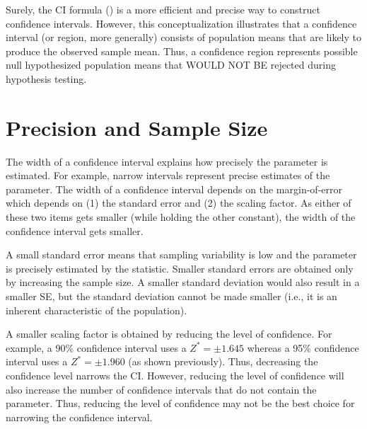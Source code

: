 \documentclass[10pt,openany]{book}\usepackage[]{graphicx}\usepackage[]{color}
\begin{document}
Surely, the CI formula () is a more efficient and precise way to construct confidence intervals.  However, this conceptualization illustrates that a confidence interval (or region, more generally) consists of population means that are likely to produce the observed sample mean.  Thus, a confidence region represents possible null hypothesized population means that WOULD NOT BE rejected during hypothesis testing.


\vspace{-12pt}


\section{Precision and Sample Size} 
\vspace{-12pt}
The width of a confidence interval explains how precisely the parameter is estimated.  For example, narrow intervals represent precise estimates of the parameter.  The width of a confidence interval depends on the margin-of-error which depends on (1) the standard error and (2) the scaling factor.  As either of these two items gets smaller (while holding the other constant), the width of the confidence interval gets smaller.


\vspace{-12pt}

A small standard error means that sampling variability is low and the parameter is precisely estimated by the statistic.  Smaller standard errors are obtained only by increasing the sample size.  A smaller standard deviation would also result in a smaller SE, but the standard deviation cannot be made smaller (i.e., it is an inherent characteristic of the population).


A smaller scaling factor is obtained by reducing the level of confidence.  For example, a 90\% confidence interval uses a $Z^{*}=\pm1.645$ whereas a 95\% confidence interval uses a $Z^{*}=\pm1.960$ (as shown previously).  Thus, decreasing the confidence level narrows the CI.  However, reducing the level of confidence will also increase the number of confidence intervals that do not contain the parameter. Thus, reducing the level of confidence may not be the best choice for narrowing the confidence interval.
\end{document}
